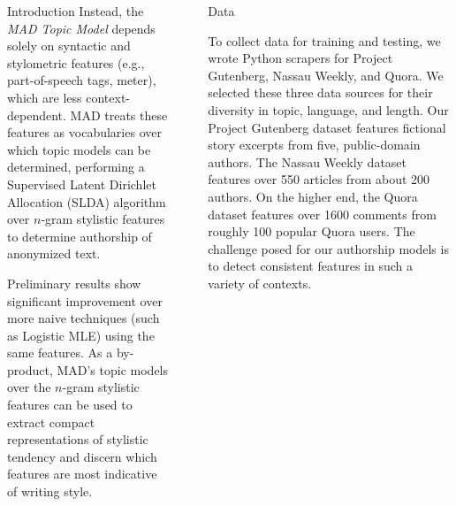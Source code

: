 \documentclass[final]{beamer}
\newlength{\sepwid}
\newlength{\onecolwid}
\newlength{\twocolwid}
\begin{document}
\begin{frame}[t]
\begin{columns}[t]
\begin{column}{\onecolwid}
\begin{block}{Introduction}
Instead, the \textit{MAD Topic Model} depends solely on syntactic and stylometric features (e.g., part-of-speech tags, meter), which are less context-dependent. MAD treats these features as vocabularies over which topic models can be determined, performing a Supervised Latent Dirichlet Allocation (SLDA) algorithm over $n$-gram stylistic features to determine authorship of anonymized text.

Preliminary results show significant improvement over more naive techniques (such as Logistic MLE) using the same features. As a by-product, MAD's topic models over the $n$-gram stylistic features can be used to extract compact representations of stylistic tendency and discern which features are most indicative of writing style.

\end{block}




\end{column} %

\begin{column}{\sepwid}\end{column} %

\begin{column}{\twocolwid} %

\begin{columns}[t,totalwidth=\twocolwid] %

\begin{column}{\onecolwid}\vspace{-.6in} %


\begin{block}{Data}

To collect data for training and testing, we wrote Python scrapers for Project Gutenberg, Nassau Weekly, and Quora. We selected these three data sources for their diversity in topic, language, and length. Our Project Gutenberg dataset features fictional story excerpts from five, public-domain authors. The Nassau Weekly dataset features over 550 articles from about 200 authors. On the higher end, the Quora dataset features over 1600 comments from roughly 100 popular Quora users. The challenge posed for our authorship models is to detect consistent features in such a variety of contexts.


\end{block}
\end{column}
\end{columns}
\end{column}
\end{columns}
\end{frame}
\end{document}

